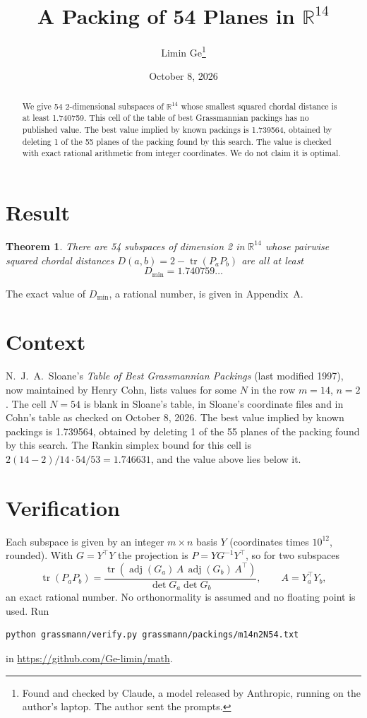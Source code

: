 \documentclass[11pt,a4paper]{article}
\title{A Packing of 54 Planes in $\mathbb{R}^{14}$}
\author{Limin Ge\thanks{Found and checked by Claude, a model released by Anthropic, running on the author's laptop. The author sent the prompts.}}
\date{October 8, 2026}
\newtheorem*{theorem}{Theorem}
\begin{document}
\maketitle
\begin{abstract}
We give 54 2-dimensional subspaces of $\mathbb{R}^{14}$ whose smallest squared chordal distance is at least 1.740759. This cell of the table of best Grassmannian packings has no published value. The best value implied by known packings is 1.739564, obtained by deleting 1 of the 55 planes of the packing found by this search. The value is checked with exact rational arithmetic from integer coordinates. We do not claim it is optimal.
\end{abstract}

\section{Result}
\begin{theorem}
There are 54 subspaces of dimension 2 in $\mathbb{R}^{14}$ whose pairwise squared chordal distances $D(a,b) = 2 - \operatorname{tr}(P_aP_b)$ are all at least
\[ D_{\min} = 1.740759\ldots \]
\end{theorem}
The exact value of $D_{\min}$, a rational number, is given in Appendix~A.


\section{Context}
N.~J.~A.~Sloane's \emph{Table of Best Grassmannian Packings} (last modified 1997), now maintained by Henry Cohn, lists values for some $N$ in the row $m=14$, $n=2$. The cell $N=54$ is blank in Sloane's table, in Sloane's coordinate files and in Cohn's table as checked on October 8, 2026. The best value implied by known packings is 1.739564, obtained by deleting 1 of the 55 planes of the packing found by this search. The Rankin simplex bound for this cell is $2(14-2)/14\cdot 54/53 = 1.746631$, and the value above lies below it.


\section{Verification}
Each subspace is given by an integer $m\times n$ basis $Y$ (coordinates times $10^{12}$, rounded). With $G=Y^\top Y$ the projection is $P=YG^{-1}Y^\top$, so for two subspaces
\[ \operatorname{tr}(P_aP_b)=\frac{\operatorname{tr}(\operatorname{adj}(G_a)\,A\,\operatorname{adj}(G_b)\,A^\top)}{\det G_a\det G_b},\qquad A=Y_a^\top Y_b, \]
an exact rational number. No orthonormality is assumed and no floating point is used. Run
\begin{verbatim}
python grassmann/verify.py grassmann/packings/m14n2N54.txt
\end{verbatim}
in \url{https://github.com/Ge-limin/math}.
\end{document}
